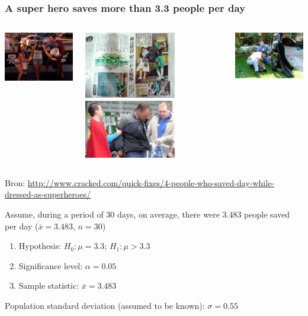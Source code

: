 \documentclass{beamer}
\begin{document}
\begin{frame}
  \frametitle{A super hero saves more than 3.3 people per day}

  \begin{columns}
    \centering
    \includegraphics[width=4cm]{img/les5-gered1}

    \includegraphics[width=4cm]{img/les5-gered2}
    \centering
    \includegraphics[width=4cm]{img/les5-gered3}

    \includegraphics[width=4cm]{img/les5-gered4}
  \end{columns}

  \vfill
  \centering
  \small{Bron: \url{http://www.cracked.com/quick-fixes/4-people-who-saved-day-while-dressed-as-superheroes/}}
\end{frame}

\begin{frame}
Assume, during a period of 30 days, on average, there were 3.483 people saved per day ($\overline{x}=3.483$, $n=30$)
\vfill
  \begin{enumerate}
    \item Hypothesis: $H_0: \mu = 3.3$; $H_1: \mu > 3.3$
    \item Significance level: $\alpha = 0.05$
    \item Sample statistic: $\overline{x} = 3.483$
  \end{enumerate}
\vfill
Population standard deviation (assumed to be known): $\sigma = 0.55$
\end{frame}
\end{document}
